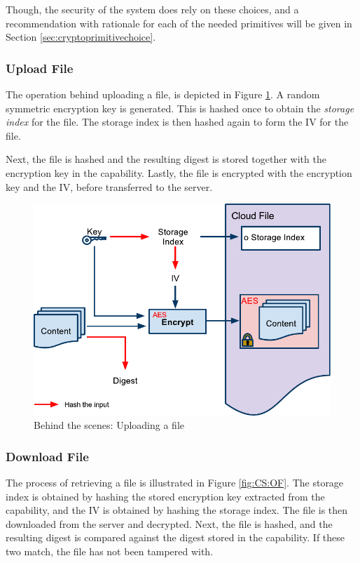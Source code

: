 \documentclass[pdftex,english,10pt,b5paper,twoside]{book}
\begin{document}
Though, the security of the system does rely on these choices, and a
recommendation with rationale for each of the needed primitives will be given
in Section \ref{sec:cryptoprimitivechoice}.

\subsubsection{Upload File}
\label{sec:CS:CF}

The operation behind uploading a file, is depicted in Figure \ref{fig:CS:CF}. A
random symmetric encryption key is generated. This is hashed once to obtain the
\emph{storage index} for the file. The storage index is then hashed again to
form the \ac{IV} for the file.

Next, the file is hashed and the resulting digest is stored together with the
encryption key in the capability. Lastly, the file is encrypted with the
encryption key and the \ac{IV}, before transferred to the server.

\begin{figure}[h!]
    \centering
    \includegraphics[width=\columnwidth]{CryptoCreateFile.pdf}
    \caption{Behind the scenes: Uploading a file}
    \label{fig:CS:CF}
\end{figure}

\subsubsection{Download File}
\label{sec:CS:OF}

The process of retrieving a file is illustrated in Figure \ref{fig:CS:OF}. The
storage index is obtained by hashing the stored encryption key extracted from
the capability, and the \ac{IV} is obtained by hashing the storage index. The
file is then downloaded from the server and decrypted. Next, the file is
hashed, and the resulting digest is compared against the digest stored in the
capability. If these two match, the file has not been tampered with.
\end{document}

